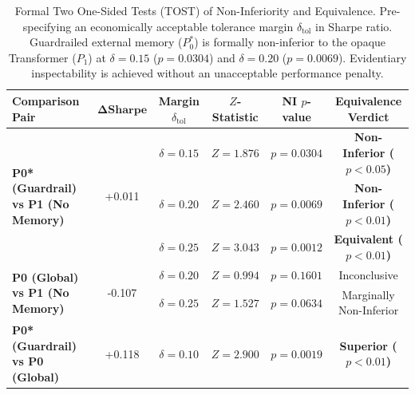 \begin{table}[ht]
\centering
\small
\begin{tabular}{lccccc}
\toprule
\textbf{Comparison Pair} & $\mathbf{\Delta \text{Sharpe}}$ & \textbf{Margin $\delta_{\text{tol}}$} & \textbf{$Z$-Statistic} & \textbf{NI $p$-value} & \textbf{Equivalence Verdict} \\
\midrule
\multirow{3}{*}{\textbf{P0* (Guardrail) vs P1 (No Memory)}} & \multirow{3}{*}{+0.011} & $\delta = 0.15$ & $Z = 1.876$ & $p = 0.0304$ & \textbf{Non-Inferior ($p < 0.05$)} \\
& & $\delta = 0.20$ & $Z = 2.460$ & $p = 0.0069$ & \textbf{Non-Inferior ($p < 0.01$)} \\
& & $\delta = 0.25$ & $Z = 3.043$ & $p = 0.0012$ & \textbf{Equivalent ($p < 0.01$)} \\
\midrule
\multirow{2}{*}{\textbf{P0 (Global) vs P1 (No Memory)}} & \multirow{2}{*}{-0.107} & $\delta = 0.20$ & $Z = 0.994$ & $p = 0.1601$ & Inconclusive \\
& & $\delta = 0.25$ & $Z = 1.527$ & $p = 0.0634$ & Marginally Non-Inferior \\
\midrule
\textbf{P0* (Guardrail) vs P0 (Global)} & +0.118 & $\delta = 0.10$ & $Z = 2.900$ & $p = 0.0019$ & \textbf{Superior ($p < 0.01$)} \\
\bottomrule
\end{tabular}
\caption{Formal Two One-Sided Tests (TOST) of Non-Inferiority and Equivalence. Pre-specifying an economically acceptable tolerance margin $\delta_{\text{tol}}$ in Sharpe ratio. Guardrailed external memory ($P_0^*$) is formally non-inferior to the opaque Transformer ($P_1$) at $\delta = 0.15$ ($p = 0.0304$) and $\delta = 0.20$ ($p = 0.0069$). Evidentiary inspectability is achieved without an unacceptable performance penalty.}
\label{tab:non_inferiority_equivalence}
\end{table}
